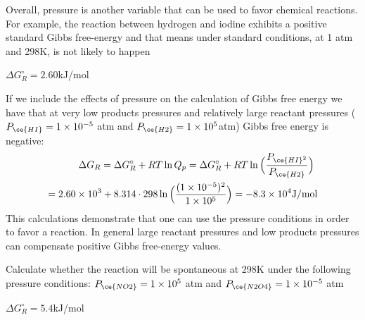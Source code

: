 \documentclass[main.tex]{subfiles}
\begin{document}
\begin{description}
Overall, pressure is another variable that can be used to favor chemical reactions. For example, the reaction between hydrogen and iodine exhibits a positive standard Gibbs free-energy and that means under standard conditions, at 1 atm and 298K, is not likely to happen
\begin{center}\hfill $\Delta G^{\circ}_R=2.60$kJ/mol\end{center}
If we include the effects of pressure on the calculation of Gibbs free energy we have that at very low products pressures and relatively large reactant pressures ($P_{\ce{HI}}=1\times 10^{-5}$ atm and $P_{\ce{H2}}=1\times 10^{5}$atm) Gibbs free energy is negative:
\begin{equation*}\begin{split}  \Delta G_R= \Delta G^{\circ}_R + RT\ln Q_p=   \Delta G^{\circ}_R + RT\ln \Big( \frac{P_{\ce{HI}^2}}	{P_{\ce{H2}}} \Big)\hfill \text{ }\\
 \hfill =  2.60\times 10^3 +8.314\cdot 298 \ln \Big( \frac{ (1\times 10^{-5})^2}{1\times 10^{5}} \Big) =-8.3\times 10^4 \text{J/mol}\end{split}\end{equation*} 
This calculations demonstrate that one can use the pressure conditions in order to favor a reaction. In general large reactant pressures and low products pressures can compensate positive Gibbs free-energy values. 
\begin{example} %
Calculate whether the reaction will be spontaneous at 298K under the following pressure conditions: $P_{\ce{NO2}}=1\times 10^{5}$ atm and $P_{\ce{N2O4}}=1\times 10^{-5}$ atm 
\begin{center}\hfill $\Delta G^{\circ}_R=5.4$kJ/mol\end{center}


\end{example}
\end{description}
\end{document}
